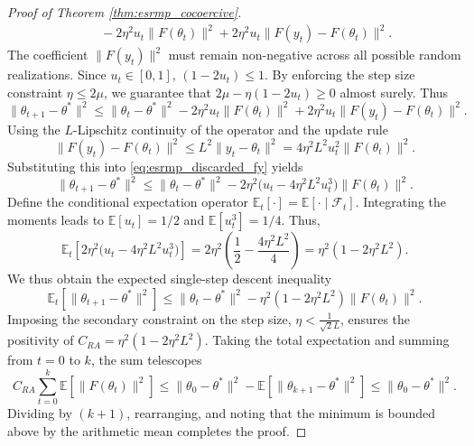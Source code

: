 \documentclass[letter,11pt]{article}
\begin{document}
\begin{proof}[Proof of Theorem \ref{thm:esrmp_cocoercive}]
\begin{equation}
\begin{aligned}
&\quad - 2\eta^2 u_t \|F(\theta_t)\|^2 + 2\eta^2 u_t \|F(y_t) - F(\theta_t)\|^2.
\end{aligned}
\end{equation}
The coefficient $\|F(y_t)\|^2$ must remain non-negative across all possible random realizations. Since $u_t \in [0, 1]$, $(1 - 2u_t) \leq 1$. By enforcing the step size constraint $\eta \le 2\mu$, we guarantee that $2\mu - \eta(1 - 2u_t) \ge 0$ almost surely. Thus
\begin{equation} \label{eq:esrmp_discarded_fy}
\|\theta_{t+1} - \theta^*\|^2 \le \|\theta_t - \theta^*\|^2 - 2\eta^2 u_t \|F(\theta_t)\|^2 + 2\eta^2 u_t \|F(y_t) - F(\theta_t)\|^2.
\end{equation}
Using the $L$-Lipschitz continuity of the operator and the update rule
\begin{equation}
\|F(y_t) - F(\theta_t)\|^2 \le L^2 \|y_t - \theta_t\|^2 = 4\eta^2 L^2 u_t^2 \|F(\theta_t)\|^2.
\end{equation}
Substituting this into \eqref{eq:esrmp_discarded_fy} yields
\begin{equation} \label{eq:esrmp_pre_expectation}
\|\theta_{t+1} - \theta^*\|^2 \le \|\theta_t - \theta^*\|^2 - 2\eta^2 \big( u_t - 4\eta^2 L^2 u_t^3 \big) \|F(\theta_t)\|^2.
\end{equation}
Define the conditional expectation operator $\mathbb{E}_t[\cdot] = \mathbb{E}[\cdot \mid \mathcal{F}_t]$. Integrating the moments leads to $\mathbb{E}[u_t] = 1/2$ and $\mathbb{E}[u_t^3] = 1/4$. Thus,
\begin{equation}
\mathbb{E}_t \left[ 2\eta^2 \big( u_t - 4\eta^2 L^2 u_t^3 \big) \right] = 2\eta^2 \left( \frac{1}{2} - \frac{4\eta^2 L^2}{4} \right) = \eta^2 \left( 1 - 2\eta^2 L^2 \right).
\end{equation}
We thus obtain the expected single-step descent inequality
\begin{equation}
\mathbb{E}_t\left[\|\theta_{t+1} - \theta^*\|^2\right] \le \|\theta_t - \theta^*\|^2 - \eta^2 \left( 1 - 2\eta^2 L^2 \right) \|F(\theta_t)\|^2.
\end{equation}
Imposing the secondary constraint on the step size, $\eta < \frac{1}{\sqrt{2}L}$, ensures the positivity of $C_{RA} = \eta^2 (1 - 2\eta^2 L^2)$. Taking the total expectation and summing from $t = 0$ to $k$, the sum telescopes
\begin{equation}
C_{RA} \sum_{t=0}^k \mathbb{E}\left[\|F(\theta_t)\|^2\right] \le \|\theta_0 - \theta^*\|^2 - \mathbb{E}\left[\|\theta_{k+1} - \theta^*\|^2\right] \le \|\theta_0 - \theta^*\|^2.
\end{equation}
Dividing by $(k+1)$, rearranging, and noting that the minimum is bounded above by the arithmetic mean completes the proof.
\end{proof}
\end{document}
